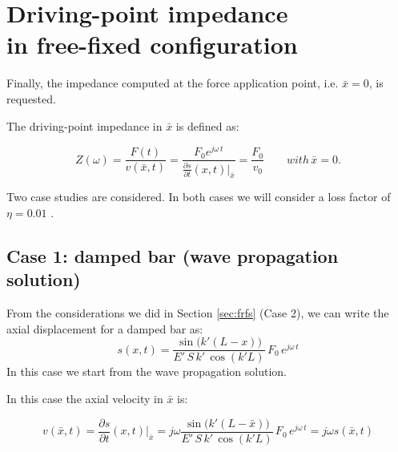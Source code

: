 \documentclass[a4paper,12pt,oneside]{article}
\begin{document}
\vspace{150pt}

\begin{figure}[h]
	\centering
	\def\svgwidth{\columnwidth}
	
\end{figure}

\clearpage

\begin{figure}[h]
	\vspace{50pt}
	\centering
	\def\svgwidth{\columnwidth}
	
\end{figure}


\section{Driving-point impedance \\ in free-fixed configuration}

Finally, the impedance computed at the force application point, i.e. $ \bar{x} = 0 $, is requested. 

The driving-point impedance in $\bar{x}$ is defined as:

\[
Z( \omega ) =
\frac{F(t)}{v(\bar{x},t)} =
\frac{F_0 e^{j \omega \, t}}{ 
	\frac{\partial s}{\partial t} (x,t) \vert_{\bar{x}}} =
\frac{F_0}{v_0}
\qquad with \, \bar{x} = 0.
\]

Two case studies are considered. In both cases we will consider a loss factor of $\eta = 0.01$ .

\subsection*{Case 1: damped bar (wave propagation solution)}

From the considerations we did in Section \ref{sec:frfs} (Case 2), we can write the axial displacement for a damped bar as:
\[
s(x,t) = 
		\frac{\sin\bigl(k'(L - x)\bigr)}{E' \, S \, k' \, \cos(k'L)} \,
		F_0 \, e^{j \omega \, t} 
\]
In this case we start from the wave propagation solution.


In this case the axial velocity in $\bar{x}$ is:

\[
v(\bar{x},t) = \frac{\partial s}{\partial t} (x,t) \vert_{\bar{x}} =
j \omega \frac{\sin\bigl(k'(L - \bar{x})\bigr)}{E' \, S \, k' \, \cos(k'L)} \,
		F_0 \, e^{j \omega \, t} = 
j \omega s(\bar{x},t)
\]
\end{document}
